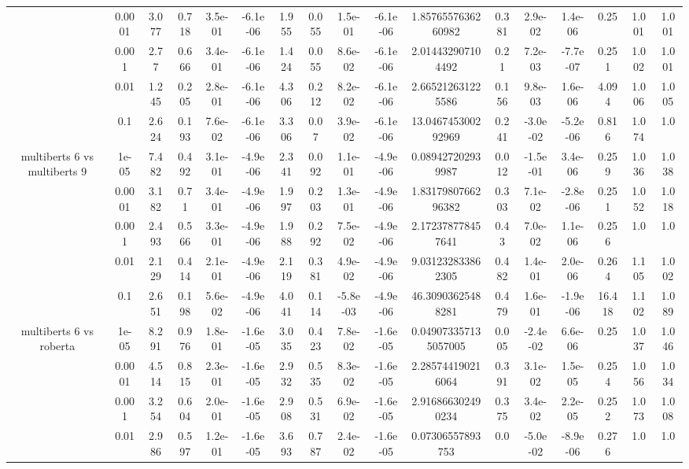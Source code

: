 \begin{tabular}{|c|c|c|c|c|c|c|c|c|c|c|c|c|c|c|c|c|}
 & 0.0001 & 3.077 & 0.718 & 3.5e-01 & -6.1e-06 & 1.955 & 0.055 & 1.5e-01 & -6.1e-06 & 1.8576557636260982 & 0.381 & 2.9e-02 & 1.4e-06 & 0.25 & 1.001 & 1.001 \\
 & 0.001 & 2.77 & 0.666 & 3.4e-01 & -6.1e-06 & 1.424 & 0.055 & 8.6e-02 & -6.1e-06 & 2.014432907104492 & 0.21 & 7.2e-03 & -7.7e-07 & 0.251 & 1.002 & 1.001 \\
 & 0.01 & 1.245 & 0.205 & 2.8e-01 & -6.1e-06 & 4.306 & 0.212 & 8.2e-02 & -6.1e-06 & 2.665212631225586 & 0.156 & 9.8e-03 & 1.6e-06 & 4.094 & 1.006 & 1.005 \\
 & 0.1 & 2.624 & 0.193 & 7.6e-02 & -6.1e-06 & 3.306 & 0.07 & 3.9e-02 & -6.1e-06 & 13.046745300292969 & 0.241 & -3.0e-02 & -5.2e-06 & 0.816 & 1.074 & 1.0 \\
\hline
\multirow{5}{*}{multiberts 6 vs multiberts 9} & 1e-05 & 7.482 & 0.492 & 3.1e-01 & -4.9e-06 & 2.341 & 0.092 & 1.1e-01 & -4.9e-06 & 0.089427202939987 & 0.012 & -1.5e-01 & 3.4e-06 & 0.259 & 1.036 & 1.038 \\
 & 0.0001 & 3.182 & 0.71 & 3.4e-01 & -4.9e-06 & 1.997 & 0.203 & 1.3e-01 & -4.9e-06 & 1.8317980766296382 & 0.303 & 7.1e-02 & -2.8e-06 & 0.251 & 1.052 & 1.018 \\
 & 0.001 & 2.493 & 0.566 & 3.3e-01 & -4.9e-06 & 1.988 & 0.292 & 7.5e-02 & -4.9e-06 & 2.172378778457641 & 0.43 & 7.0e-02 & 1.1e-06 & 0.256 & 1.0 & 1.0 \\
 & 0.01 & 2.129 & 0.414 & 2.1e-01 & -4.9e-06 & 2.119 & 0.381 & 4.9e-02 & -4.9e-06 & 9.031232833862305 & 0.482 & 1.4e-01 & 2.0e-06 & 0.264 & 1.105 & 1.002 \\
 & 0.1 & 2.651 & 0.198 & 5.6e-02 & -4.9e-06 & 4.041 & 0.114 & -5.8e-03 & -4.9e-06 & 46.30903625488281 & 0.479 & 1.6e-01 & -1.9e-06 & 16.418 & 1.102 & 1.089 \\
\hline
\multirow{5}{*}{multiberts 6 vs roberta } & 1e-05 & 8.291 & 0.976 & 1.8e-01 & -1.6e-05 & 3.035 & 0.423 & 7.8e-02 & -1.6e-05 & 0.049073357135057005 & 0.005 & -2.4e-02 & 6.6e-06 & 0.25 & 1.037 & 1.046 \\
 & 0.0001 & 4.514 & 0.815 & 2.3e-01 & -1.6e-05 & 2.932 & 0.535 & 8.3e-02 & -1.6e-05 & 2.285744190216064 & 0.391 & 3.1e-02 & 1.5e-05 & 0.254 & 1.056 & 1.034 \\
 & 0.001 & 3.254 & 0.604 & 2.0e-01 & -1.6e-05 & 2.908 & 0.531 & 6.9e-02 & -1.6e-05 & 2.916866302490234 & 0.375 & 3.4e-02 & 2.2e-05 & 0.252 & 1.073 & 1.008 \\
 & 0.01 & 2.986 & 0.597 & 1.2e-01 & -1.6e-05 & 3.693 & 0.787 & 2.4e-02 & -1.6e-05 & 0.07306557893753 & 0.0 & -5.0e-02 & -8.9e-06 & 0.276 & 1.0 & 1.0 \\

\end{tabular}
